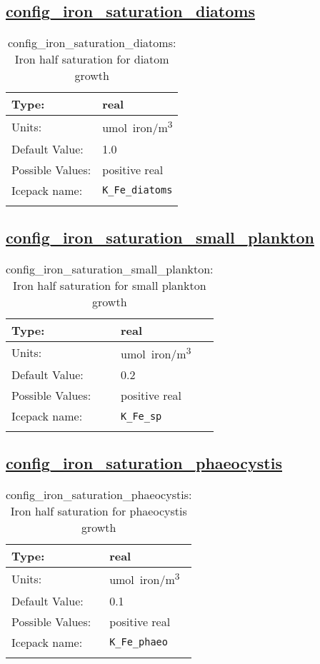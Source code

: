\subsection[config\_iron\_saturation\_diatoms]{\hyperref[sec:nm_tab_biogeochemistry]{config\_iron\_saturation\_diatoms}}
\label{subsec:nm_sec_config_iron_saturation_diatoms}
\begin{center}
\begin{longtable}{| p{2.0in} || p{4.0in} |}
    \hline
    Type: & real \\
    \hline
    Units: & \si{umol.iron/m^3} \\
    \hline
    Default Value: & 1.0 \\
    \hline
    Possible Values: & positive real \\
    \hline
    Icepack name: & \verb+K_Fe_diatoms+ \\
    \hline
    \caption{config\_iron\_saturation\_diatoms: Iron half saturation for diatom growth}
\end{longtable}
\end{center}
\subsection[config\_iron\_saturation\_small\_plankton]{\hyperref[sec:nm_tab_biogeochemistry]{config\_iron\_saturation\_small\_plankton}}
\label{subsec:nm_sec_config_iron_saturation_small_plankton}
\begin{center}
\begin{longtable}{| p{2.0in} || p{4.0in} |}
    \hline
    Type: & real \\
    \hline
    Units: & \si{umol.iron/m^3} \\
    \hline
    Default Value: & 0.2 \\
    \hline
    Possible Values: & positive real \\
    \hline
    Icepack name: & \verb+K_Fe_sp+ \\
    \hline
    \caption{config\_iron\_saturation\_small\_plankton: Iron half saturation for small plankton growth}
\end{longtable}
\end{center}
\subsection[config\_iron\_saturation\_phaeocystis]{\hyperref[sec:nm_tab_biogeochemistry]{config\_iron\_saturation\_phaeocystis}}
\label{subsec:nm_sec_config_iron_saturation_phaeocystis}
\begin{center}
\begin{longtable}{| p{2.0in} || p{4.0in} |}
    \hline
    Type: & real \\
    \hline
    Units: & \si{umol.iron/m^3} \\
    \hline
    Default Value: & 0.1 \\
    \hline
    Possible Values: & positive real \\
    \hline
    Icepack name: & \verb+K_Fe_phaeo+ \\
    \hline
    \caption{config\_iron\_saturation\_phaeocystis: Iron half saturation for phaeocystis growth}
\end{longtable}
\end{center}
